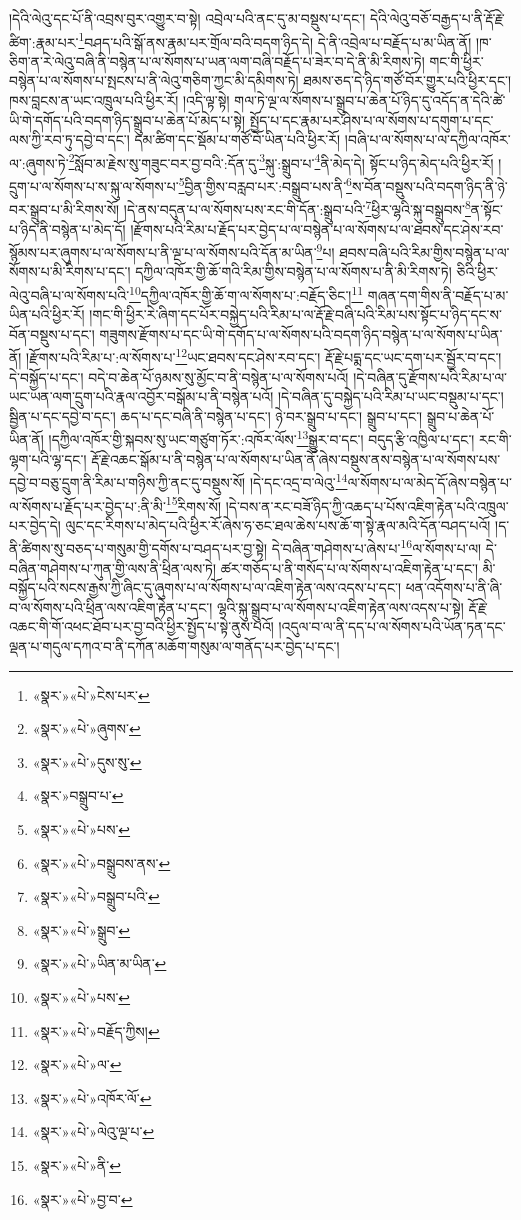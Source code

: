 །དེའི་ལེའུ་དང་པོ་ནི་འབྲས་བུར་འགྱུར་བ་སྟེ། འབྲེལ་པའི་ནང་དུ་མ་བསྡུས་པ་དང་། དེའི་ལེའུ་བཅོ་བརྒྱད་པ་ནི་རྡོ་རྗེ་ཚིག་:རྣམ་པར་\footnote{«སྣར་»«པེ་»ངེས་པར་}བཤད་པའི་སྒོ་ནས་རྣམ་པར་གྲོལ་བའི་བདག་ཉིད་དེ། དེ་ནི་འབྲེལ་པ་བརྗོད་པ་མ་ཡིན་ནོ། །ཁ་ཅིག་ན་རེ་ལེའུ་བཞི་ནི་བསྙེན་པ་ལ་སོགས་པ་ཡན་ལག་བཞི་བརྗོད་པ་ཟེར་བ་དེ་ནི་མི་རིགས་ཏེ། གང་གི་ཕྱིར་བསྙེན་པ་ལ་སོགས་པ་སྤངས་པ་ནི་ལེའུ་གཅིག་ཀྱང་མི་དམིགས་ཏེ། ཐམས་ཅད་དེ་ཉིད་གཙོ་བོར་གྱུར་པའི་ཕྱིར་དང་། ཁས་བླངས་ན་ཡང་འཁྲུལ་པའི་ཕྱིར་རོ། །འདི་ལྟ་སྟེ། གལ་ཏེ་ལྔ་ལ་སོགས་པ་སྒྲུབ་པ་ཆེན་པོ་ཉིད་དུ་འདོད་ན་དེའི་ཚེ་ཡི་གེ་དགོད་པའི་བདག་ཉིད་སྒྲུབ་པ་ཆེན་པོ་མེད་པ་སྟེ། སྤྱོད་པ་དང་རྣམ་པར་ཤེས་པ་ལ་སོགས་པ་དགུག་པ་དང་ལས་ཀྱི་རབ་ཏུ་དབྱེ་བ་དང་། དམ་ཚིག་དང་སྡོམ་པ་གཙོ་བོ་ཡིན་པའི་ཕྱིར་རོ། །བཞི་པ་ལ་སོགས་པ་ལ་དཀྱིལ་འཁོར་ལ་:ཞུགས་ཏེ་\footnote{«སྣར་»«པེ་»ཞུགས་}སློབ་མ་རྗེས་སུ་གཟུང་བར་བྱ་བའི་:དོན་དུ་\footnote{«སྣར་»«པེ་»དུས་སུ་}སྐུ་:སྒྲུབ་པ་\footnote{«སྣར་»བསྒྲུབ་པ་}ནི་མེད་དེ། སྟོང་པ་ཉིད་མེད་པའི་ཕྱིར་རོ། །དྲུག་པ་ལ་སོགས་པ་ས་སྐུ་ལ་སོགས་པ་\footnote{«སྣར་»«པེ་»པས་}བྱིན་གྱིས་བརླབ་པར་:བསྒྲུབ་པས་ནི་\footnote{«སྣར་»«པེ་»བསྒྲུབས་ནས་}ས་བོན་བསྡུས་པའི་བདག་ཉིད་ནི་ཉེ་བར་སྒྲུབ་པ་མི་རིགས་སོ། །དེ་ནས་བདུན་པ་ལ་སོགས་པས་རང་གི་དོན་:སྒྲུབ་པའི་\footnote{«སྣར་»«པེ་»བསྒྲུབ་པའི་}ཕྱིར་ལྷའི་སྐུ་བསྒྲུབས་\footnote{«སྣར་»«པེ་»སྒྲུབ་}ན་སྟོང་པ་ཉིད་ནི་བསྙེན་པ་མེད་དོ། །རྫོགས་པའི་རིམ་པ་རྗོད་པར་བྱེད་པ་ལ་བསྙེན་པ་ལ་སོགས་པ་ལ་ཐབས་དང་ཤེས་རབ་སྙོམས་པར་ཞུགས་པ་ལ་སོགས་པ་ནི་ལྔ་པ་ལ་སོགས་པའི་དོན་མ་ཡིན་\footnote{«སྣར་»«པེ་»ཡིན་མ་ཡིན་}པ། ཐབས་བཞི་པའི་རིམ་གྱིས་བསྙེན་པ་ལ་སོགས་པ་མི་རིགས་པ་དང་། དཀྱིལ་འཁོར་གྱི་ཆོ་གའི་རིམ་གྱིས་བསྙེན་པ་ལ་སོགས་པ་ནི་མི་རིགས་ཏེ། ཅིའི་ཕྱིར་ལེའུ་བཞི་པ་ལ་སོགས་པའི་\footnote{«སྣར་»«པེ་»པས་}དཀྱིལ་འཁོར་གྱི་ཆོ་ག་ལ་སོགས་པ་:བརྗོད་ཅིང་།\footnote{«སྣར་»«པེ་»བརྗོད་ཀྱིས།} གཞན་དག་གིས་ནི་བརྗོད་པ་མ་ཡིན་པའི་ཕྱིར་རོ། །གང་གི་ཕྱིར་རེ་ཞིག་དང་པོར་བསྐྱེད་པའི་རིམ་པ་ལ་རྡོ་རྗེ་བཞི་པའི་རིམ་པས་སྟོང་པ་ཉིད་དང་ས་བོན་བསྡུས་པ་དང་། གཟུགས་རྫོགས་པ་དང་ཡི་གེ་དགོད་པ་ལ་སོགས་པའི་བདག་ཉིད་བསྙེན་པ་ལ་སོགས་པ་ཡིན་ནོ། །རྫོགས་པའི་རིམ་པ་:ལ་སོགས་པ་\footnote{«སྣར་»«པེ་»ལ་}ཡང་ཐབས་དང་ཤེས་རབ་དང་། རྡོ་རྗེ་པདྨ་དང་ཡང་དག་པར་སྦྱོར་བ་དང་། དེ་བསྐྱོད་པ་དང་། བདེ་བ་ཆེན་པོ་ཉམས་སུ་མྱོང་བ་ནི་བསྙེན་པ་ལ་སོགས་པའོ། །དེ་བཞིན་དུ་རྫོགས་པའི་རིམ་པ་ལ་ཡང་ཡན་ལག་དྲུག་པའི་རྣལ་འབྱོར་བསྒོམ་པ་ནི་བསྙེན་པའོ། །དེ་བཞིན་དུ་བསྐྱེད་པའི་རིམ་པ་ཡང་བསྡུམ་པ་དང་། སྦྱིན་པ་དང་དབྱེ་བ་དང་། ཆད་པ་དང་བཞི་ནི་བསྙེན་པ་དང་། ཉེ་བར་སྒྲུབ་པ་དང་། སྒྲུབ་པ་དང་། སྒྲུབ་པ་ཆེན་པོ་ཡིན་ནོ། །དཀྱིལ་འཁོར་གྱི་སྐབས་སུ་ཡང་གཙུག་ཏོར་:འཁོར་ལོས་\footnote{«སྣར་»«པེ་»འཁོར་ལོ་}སྒྱུར་བ་དང་། བདུད་རྩི་འཁྱིལ་པ་དང་། རང་གི་ལྷག་པའི་ལྷ་དང་། རྡོ་རྗེ་འཆང་སྒོམ་པ་ནི་བསྙེན་པ་ལ་སོགས་པ་ཡིན་ནོ་ཞེས་བསྡུས་ནས་བསྙེན་པ་ལ་སོགས་པས་དབྱེ་བ་བཅུ་དྲུག་ནི་རིམ་པ་གཉིས་ཀྱི་ནང་དུ་བསྡུས་སོ། །དེ་དང་འདྲ་བ་ལེའུ་\footnote{«སྣར་»«པེ་»ལེའུ་ལྔ་པ་}ལ་སོགས་པ་ལ་མེད་དོ་ཞེས་བསྙེན་པ་ལ་སོགས་པ་རྗོད་པར་བྱེད་པ་:ནི་མི་\footnote{«སྣར་»«པེ་»ནི་}རིགས་སོ། །དེ་བས་ན་རང་བཟོ་ཉིད་ཀྱི་འཆད་པ་པོས་འཇིག་རྟེན་པའི་འཁྲུལ་པར་བྱེད་དེ། ལུང་དང་རིགས་པ་མེད་པའི་ཕྱིར་རོ་ཞེས་ཧ་ཅང་ཐལ་ཆེས་པས་ཆོ་ག་སྟེ་རྣལ་མའི་དོན་བཤད་པའོ། །ད་ནི་ཚིགས་སུ་བཅད་པ་གསུམ་གྱི་དགོས་པ་བཤད་པར་བྱ་སྟེ། དེ་བཞིན་གཤེགས་པ་ཞེས་པ་\footnote{«སྣར་»«པེ་»བྱ་བ་}ལ་སོགས་པ་ལ། དེ་བཞིན་གཤེགས་པ་ཀུན་གྱི་ལས་ནི་ཕྲིན་ལས་ཏེ། ཚར་གཅོད་པ་ནི་གསོད་པ་ལ་སོགས་པ་འཇིག་རྟེན་པ་དང་། མི་བསྐྱོད་པའི་སངས་རྒྱས་ཀྱི་ཞིང་དུ་ཞུགས་པ་ལ་སོགས་པ་ལ་འཇིག་རྟེན་ལས་འདས་པ་དང་། ཕན་འདོགས་པ་ནི་ཞི་བ་ལ་སོགས་པའི་ཕྲིན་ལས་འཇིག་རྟེན་པ་དང་། ལྷའི་སྐུ་སྒྲུབ་པ་ལ་སོགས་པ་འཇིག་རྟེན་ལས་འདས་པ་སྟེ། རྡོ་རྗེ་འཆང་གི་གོ་འཕང་ཐོབ་པར་བྱ་བའི་ཕྱིར་སྤྱོད་པ་སྟེ་ནུས་པའོ། །འདུལ་བ་ལ་ནི་དད་པ་ལ་སོགས་པའི་ཡོན་ཏན་དང་ལྡན་པ་གདུལ་དཀའ་བ་ནི་དཀོན་མཆོག་གསུམ་ལ་གནོད་པར་བྱེད་པ་དང་། 
